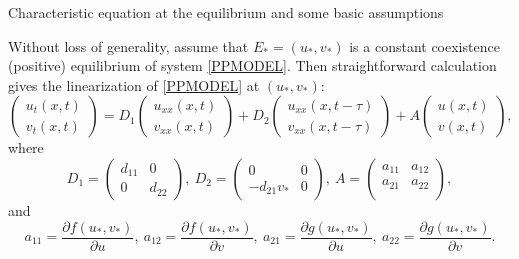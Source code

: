\documentclass[11pt]{article}
\theoremstyle{definition}
\theoremstyle{remark}
\numberwithin{equation}{section}
\begin{document}
\begin{subsection}
   {Characteristic equation at the equilibrium and some basic assumptions}
 \end{subsection}
 Without loss of generality, assume that $E_*=(u_*, v_*)$ is a constant coexistence (positive) equilibrium of system \eqref{PPMODEL}. Then straightforward calculation gives the linearization of \eqref{PPMODEL} at $(u_*, v_*)$:
\begin{equation}
\label{LPPMODEL}
\left(\begin{array}{c}
u_t(x,t)\\
v_t(x,t)
\end{array}\right)=D_1\left(\begin{array}{c}
u_{xx}(x,t)\\
v_{xx}(x,t)
\end{array}\right)+D_2\left(\begin{array}{c}
u_{xx}(x,t-\tau)\\
v_{xx}(x,t-\tau)
\end{array}\right)+A\left(\begin{array}{c}
u(x,t)\\
v(x,t)
\end{array}\right),
 \end{equation}
 where
  \begin{equation}
 \label{DJA}
D_1=\left(\begin{array}{cc}
d_{11} & 0\\
0 & d_{22}
\end{array}\right),~D_2=\left(\begin{array}{cc}
0 & 0\\
-d_{21}v_* & 0
\end{array}\right),  ~A=\left(
                          \begin{array}{cc}
                            a_{11} & a_{12} \\
                            a_{21} & a_{22} \\
                          \end{array}
                        \right),
\end{equation}
and
 $$
 a_{11}=\frac{\partial f(u_*, v_*)}{\partial u },  ~a_{12}=\frac{\partial f(u_*, v_*)}{\partial v }, ~a_{21}=\frac{\partial g(u_*, v_*)}{\partial u },  ~a_{22}=\frac{\partial g(u_*, v_*)}{\partial v }.
 $$
\end{document}
